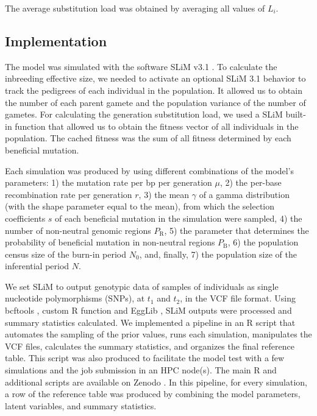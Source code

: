 \documentclass[a4paper, 12pt]{article}
\begin{document}
\noindent The average substitution load was obtained by averaging all values of $L_{i}$.

\subsection*{Implementation}

The model was simulated with the software SLiM v3.1 \citep{Haller:2017gm, Haller:2019fd}. To calculate the inbreeding effective size, we needed to activate an optional SLiM 3.1 behavior to track the pedigrees of each individual in the population. It allowed us to obtain the number of each parent gamete and the population variance of the number of gametes. For calculating the generation substitution load, we used a SLiM built-in function that allowed us to obtain the fitness vector of all individuals in the population. The cached fitness was the sum of all fitness determined by each beneficial mutation. 

Each simulation was produced by using different combinations of the model's parameters: 1) the mutation rate per bp per generation $\mu$, 2) the per-base recombination rate per generation $r$, 3) the mean $\gamma$ of a gamma distribution (with the shape parameter equal to the mean), from which the selection coefficients $s$ of each beneficial mutation in the simulation were sampled, 4) the number of non-neutral genomic regions $P_\mathrm{R}$, 5) the parameter that determines the probability of beneficial mutation in non-neutral regions $P_\mathrm{B}$, 6) the population census size of the burn-in period $N_\mathrm{0}$, and, finally, 7) the population size of the inferential period $N$.

We set SLiM to output genotypic data of samples of individuals as single nucleotide polymorphisms (SNPs), at $t_1$ and $t_2$, in the VCF file format. Using bcftools \citep{Li:2011kr}, custom R function \citep{Rcore} and EggLib \citep{Siol2022}, SLiM outputs were processed and summary statistics calculated. We implemented a pipeline in an R script that automates the sampling of the prior values, runs each simulation, manipulates the VCF files, calculates the summary statistics, and organizes the final reference table. This script was also produced to facilitate the model test with a few simulations and the job submission in an HPC node(s). The main R and additional scripts are available on Zenodo \citep{Pavinato:2021}. In this pipeline, for every simulation, a row of the reference table was produced by combining the model parameters, latent variables, and summary statistics.
\end{document}
